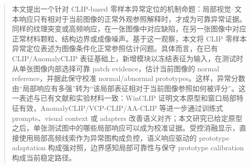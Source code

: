 \begin{abstract}
本文提出一个针对 CLIP-based 零样本异常定位的机制命题：局部视觉--文本响应只有相对于当前图像的正常外观参照解释时，才成为可靠异常证据。同样的纹理突变或高频响应，在一张图像中对应缺陷，在另一张图像中对应正常材料颗粒、结构边界或成像噪声。基于这一观察，本文将 CLIP 零样本异常定位表述为图像条件化正常参照估计问题。具体而言，在已有 CLIP/AnomalyCLIP 表征基础上，新增模块以冻结表征为输入，在测试时从单张图像内部选择可靠 patch evidence，估计当前图像的 normal reference，并据此保守校准 normal/abnormal prototypes。这样，异常分数由“局部响应有多强”转为“该局部表征相对于当前图像参照如何被评分”。这一表述与已有文献和实验材料一致：WinCLIP 证明文本原型和窗口局部特征有效，AnomalyCLIP/VCP-CLIP/AA-CLIP 等进一步通过训练式 prompts、visual context 或 adapters 改善语义对齐；本文研究已给定原型之后，单张测试图中的哪些局部响应可以成为校准证据。受控消融显示，直接使用局部高频线索作为异常图构成负控，语义响应驱动的 prototype adaptation 构成强对照，边界感知局部可靠性与保守 prototype calibration 构成当前稳定路径。
\end{abstract}
